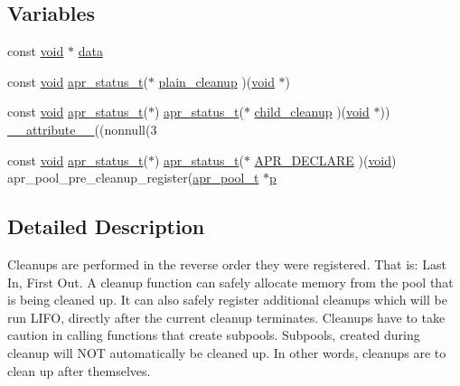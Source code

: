 \subsection*{Variables}
\begin{DoxyCompactItemize}
\item 
const \hyperlink{group__MOD__ISAPI_gacd6cdbf73df3d9eed42fa493d9b621a6}{void} $\ast$ \hyperlink{group__PoolCleanup_ga759cdc4d96e9faaa06ff1cc8ec7962f6}{data}
\item 
const \hyperlink{group__MOD__ISAPI_gacd6cdbf73df3d9eed42fa493d9b621a6}{void} \hyperlink{group__apr__errno_gaa5105fa83cc322f09382292db8b47593}{apr\+\_\+status\+\_\+t}($\ast$ \hyperlink{group__PoolCleanup_ga329cbf0c5d8e0c61c40f78cdf67d4471}{plain\+\_\+cleanup} )(\hyperlink{group__MOD__ISAPI_gacd6cdbf73df3d9eed42fa493d9b621a6}{void} $\ast$)
\item 
const \hyperlink{group__MOD__ISAPI_gacd6cdbf73df3d9eed42fa493d9b621a6}{void} \hyperlink{group__apr__errno_gaa5105fa83cc322f09382292db8b47593}{apr\+\_\+status\+\_\+t}($\ast$) \hyperlink{group__apr__errno_gaa5105fa83cc322f09382292db8b47593}{apr\+\_\+status\+\_\+t}($\ast$ \hyperlink{group__PoolCleanup_ga09accdea610fa869f6e853529fd584f1}{child\+\_\+cleanup} )(\hyperlink{group__MOD__ISAPI_gacd6cdbf73df3d9eed42fa493d9b621a6}{void} $\ast$)) \hyperlink{group__APR__Util__Bucket__Brigades_gae0af316ed59541b70389da41aaeef4b6}{\+\_\+\+\_\+attribute\+\_\+\+\_\+}((nonnull(3
\item 
const \hyperlink{group__MOD__ISAPI_gacd6cdbf73df3d9eed42fa493d9b621a6}{void} \hyperlink{group__apr__errno_gaa5105fa83cc322f09382292db8b47593}{apr\+\_\+status\+\_\+t}($\ast$) \hyperlink{group__apr__errno_gaa5105fa83cc322f09382292db8b47593}{apr\+\_\+status\+\_\+t}($\ast$ \hyperlink{group__PoolCleanup_ga8f8e9a6584250688c1f6d72252321b54}{A\+P\+R\+\_\+\+D\+E\+C\+L\+A\+RE} )(\hyperlink{group__MOD__ISAPI_gacd6cdbf73df3d9eed42fa493d9b621a6}{void}) apr\+\_\+pool\+\_\+pre\+\_\+cleanup\+\_\+register(\hyperlink{structapr__pool__t}{apr\+\_\+pool\+\_\+t} $\ast$\hyperlink{group__APACHE__CORE__MPM_ga5cd91701e5c167f2b1a38e70ab57817e}{p}
\end{DoxyCompactItemize}


\subsection{Detailed Description}
Cleanups are performed in the reverse order they were registered. That is\+: Last In, First Out. A cleanup function can safely allocate memory from the pool that is being cleaned up. It can also safely register additional cleanups which will be run L\+I\+FO, directly after the current cleanup terminates. Cleanups have to take caution in calling functions that create subpools. Subpools, created during cleanup will N\+OT automatically be cleaned up. In other words, cleanups are to clean up after themselves. 

